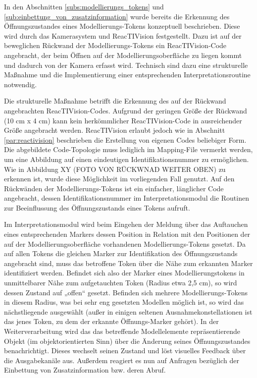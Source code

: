In den Abschnitten \ref{subs:modellierungs_tokens} und \ref{sub:einbettung_von_zusatzinformation} wurde bereits die Erkennung des Öffnungszustandes eines Modellierungs-Tokens konzeptuell beschrieben. Diese wird durch das Kamerasystem und ReacTIVision festgestellt. Dazu ist auf der beweglichen Rückwand der Modellierungs-Tokens ein ReacTIVision-Code angebracht, der beim Öffnen auf der Modellierungsoberfläche zu liegen kommt und dadurch von der Kamera erfasst wird. Technisch sind dazu eine strukturelle Maßnahme und die Implementierung einer entsprechenden Interpretationsroutine notwendig.

Die strukturelle Maßnahme betrifft die Erkennung des auf der Rückwand angebrachten ReacTIVision-Codes. Aufgrund der geringen Größe der Rückwand (10 cm x 4 cm) kann kein herkömmlicher ReacTIVision-Code in ausreichender Größe angebracht werden. ReacTIVision erlaubt jedoch wie in Abschnitt \ref{par:reactivision} beschrieben die Erstellung von eigenen Codes beliebiger Form. Die abgebildete Code-Topologie muss lediglich im Mapping-File vermerkt werden, um eine Abbildung auf einen eindeutigen Identifikationsnummer zu ermöglichen. Wie in Abbildung XY (FOTO VON RÜCKWNAD WEITER OBEN) zu erkennen ist, wurde diese Möglichkeit im vorliegenden Fall genutzt. Auf den Rückwänden der Modellierungs-Tokens ist ein einfacher, länglicher Code angebracht, dessen Identifikationsnummer im Interpretationsmodul die Routinen zur Beeinflussung des Öffnungszustands eines Tokens aufruft.

Im Interpretationsmodul wird beim Eingehen der Meldung über das Auftauchen eines entsprechenden Markers dessen Position in Relation mit den Positionen der auf der Modellierungsoberfläche vorhandenen Modellierungs-Tokens gesetzt. Da auf allen Tokens die gleichen Marker zur Identifikation des Öffnungszustands angebracht sind, muss das betroffene Token über die Nähe zum erkannten Marker identifiziert werden. Befindet sich also der Marker eines Modellierungstokens in unmittelbarer Nähe zum aufgetauchten Token (Radius etwa 2,5 cm), so wird dessen Zustand auf „offen“ gesetzt. Befinden sich mehrere Modellierungs-Tokens in diesem Radius, was bei sehr eng gesetzten Modellen möglich ist, so wird das nächstliegende ausgewählt (außer in einigen seltenen Ausnahmekonstellationen ist das jenes Token, zu dem der erkannte Öffnungs-Marker gehört). In der Weiterverarbeitung wird das das betreffende Modellelemente repräsentierende Objekt (im objektorientierten Sinn) über die Änderung seines Öffnungszustandes benachrichtigt. Dieses wechselt seinen Zustand und löst visuelles Feedback über die Ausgabekanäle aus. Außerdem reagiert es nun auf Anfragen bezüglich der Einbettung von Zusatzinformation bzw. deren Abruf.

